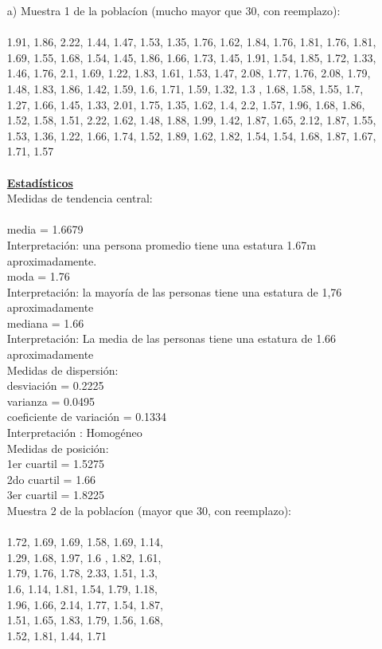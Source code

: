 \documentclass[a4paper,12pt]{article}
\begin{document}
\begin{enumerate}
    \item[a)] Muestra 1 de la poblac\'ion (mucho mayor que 30, con reemplazo): \\\\
1.91,   1.86,   2.22,   1.44,	1.47,   1.53,
1.35,	1.76,	1.62,	1.84,   1.76,	1.81,
1.76,	1.81,	1.69,	1.55,   1.68,	1.54,
1.45,	1.86,	1.66,	1.73,   1.45,	1.91,
1.54,	1.85,	1.72,	1.33,   1.46,	1.76,
2.1,    1.69,	1.22,	1.83,   1.61,	1.53,   
1.47,	2.08,	1.77,	1.76,   2.08,	1.79,
1.48,	1.83,	1.86,	1.42,   1.59,	1.6,
1.71,	1.59,	1.32,	1.3	,   1.68,	1.58,
1.55,	1.7,    1.27,	1.66,   1.45,	1.33,
2.01,	1.75,	1.35,	1.62,   1.4,    2.2,
1.57,	1.96,	1.68,	1.86,   1.52,	1.58,
1.51,	2.22,	1.62,	1.48,   1.88,	1.99,
1.42,	1.87,	1.65,	2.12,   1.87,	1.55,
1.53,	1.36,	1.22,	1.66,   1.74,	1.52,
1.89,	1.62,	1.82,	1.54,   1.54,	1.68,
1.87,	1.67,	1.71,	1.57\\\\

\newpage
\textbf{\underline{Estad\'isticos}} \\

Medidas de tendencia central:\\\\
media = 1.6679\\
Interpretaci\'on: una persona promedio tiene una estatura 1.67m aproximadamente.\\
moda = 1.76\\
Interpretaci\'on: la mayor\'ia de las personas tiene una estatura de 1,76 aproximadamente\\
mediana = 1.66\\
Interpretaci\'on: La media de las personas tiene una estatura de 1.66 aproximadamente\\

Medidas de dispersi\'on:\\
desviaci\'on = 0.2225\\
varianza = 0.0495\\
coeficiente de variaci\'on = 0.1334\\
Interpretaci\'on : Homog\'eneo\\

Medidas de posici\'on:\\
1er cuartil = 1.5275\\
2do cuartil = 1.66\\
3er cuartil = 1.8225\\

Muestra 2 de la poblac\'ion (mayor que 30, con reemplazo): \\\\
1.72,	1.69,	1.69,	1.58,	1.69,	1.14,\\
1.29,	1.68,	1.97,	1.6	,   1.82,	1.61,\\
1.79,	1.76,	1.78,	2.33,	1.51,	1.3,\\
1.6,    1.14,	1.81,	1.54,	1.79,	1.18,\\
1.96,	1.66,	2.14,	1.77,	1.54,	1.87,\\
1.51,	1.65,	1.83,	1.79,	1.56,	1.68,\\
1.52,	1.81,	1.44,	1.71\\


\end{enumerate}
\end{document}
